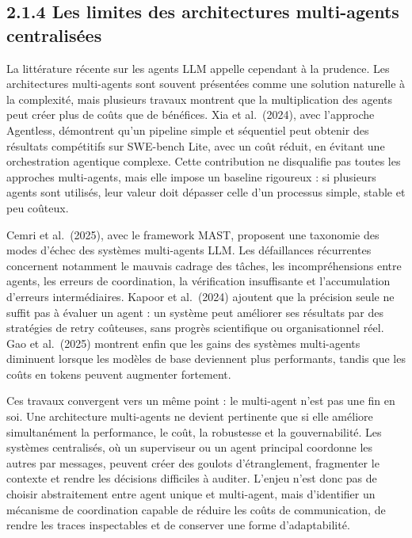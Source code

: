 \subsection{2.1.4 Les limites des architectures multi-agents centralisées}\label{les-limites-des-architectures-multi-agents-centralisuxe9es}

La littérature récente sur les agents LLM appelle cependant à la prudence. Les architectures multi-agents sont souvent présentées comme une solution naturelle à la complexité, mais plusieurs travaux montrent que la multiplication des agents peut créer plus de coûts que de bénéfices. Xia et al.~(2024), avec l'approche Agentless, démontrent qu'un pipeline simple et séquentiel peut obtenir des résultats compétitifs sur SWE-bench Lite, avec un coût réduit, en évitant une orchestration agentique complexe. Cette contribution ne disqualifie pas toutes les approches multi-agents, mais elle impose un baseline rigoureux : si plusieurs agents sont utilisés, leur valeur doit dépasser celle d'un processus simple, stable et peu coûteux.

Cemri et al.~(2025), avec le framework MAST, proposent une taxonomie des modes d'échec des systèmes multi-agents LLM. Les défaillances récurrentes concernent notamment le mauvais cadrage des tâches, les incompréhensions entre agents, les erreurs de coordination, la vérification insuffisante et l'accumulation d'erreurs intermédiaires. Kapoor et al.~(2024) ajoutent que la précision seule ne suffit pas à évaluer un agent : un système peut améliorer ses résultats par des stratégies de retry coûteuses, sans progrès scientifique ou organisationnel réel. Gao et al.~(2025) montrent enfin que les gains des systèmes multi-agents diminuent lorsque les modèles de base deviennent plus performants, tandis que les coûts en tokens peuvent augmenter fortement.

Ces travaux convergent vers un même point : le multi-agent n'est pas une fin en soi. Une architecture multi-agents ne devient pertinente que si elle améliore simultanément la performance, le coût, la robustesse et la gouvernabilité. Les systèmes centralisés, où un superviseur ou un agent principal coordonne les autres par messages, peuvent créer des goulots d'étranglement, fragmenter le contexte et rendre les décisions difficiles à auditer. L'enjeu n'est donc pas de choisir abstraitement entre agent unique et multi-agent, mais d'identifier un mécanisme de coordination capable de réduire les coûts de communication, de rendre les traces inspectables et de conserver une forme d'adaptabilité.


